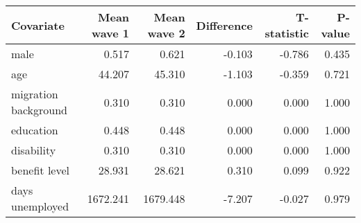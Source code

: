 
\begin{tabular}{lrrrrr}
\toprule
Covariate & Mean wave 1 & Mean wave 2 & Difference & T-statistic & P-value\\
\midrule
male & 0.517 & 0.621 & -0.103 & -0.786 & 0.435\\
age & 44.207 & 45.310 & -1.103 & -0.359 & 0.721\\
migration background & 0.310 & 0.310 & 0.000 & 0.000 & 1.000\\
education & 0.448 & 0.448 & 0.000 & 0.000 & 1.000\\
disability & 0.310 & 0.310 & 0.000 & 0.000 & 1.000\\
benefit level & 28.931 & 28.621 & 0.310 & 0.099 & 0.922\\
days unemployed & 1672.241 & 1679.448 & -7.207 & -0.027 & 0.979\\
\bottomrule
\end{tabular}
